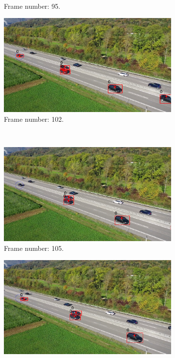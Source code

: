 \begin{figure}[H]
\begin{subfigure}{0.48\textwidth}
        \caption{Frame number: 95.}
        \label{fig:E1-V2-S0:03}
    \end{subfigure}
    \begin{subfigure}{0.48\textwidth}
        \centering
        \includegraphics[width=\linewidth]{../../../experiments/E1/V2/noPd/102}
        \caption{Frame number: 102.}
        \label{fig:E1-V2-S0:04}
    \end{subfigure}
    \\
    \begin{subfigure}{0.48\textwidth}
        \centering
        \includegraphics[width=\linewidth]{../../../experiments/E1/V2/noPd/105}
        \caption{Frame number: 105.}
        \label{fig:E1-V2-S0:05}
    \end{subfigure}
    \begin{subfigure}{0.48\textwidth}
        \centering
        \includegraphics[width=\linewidth]{../../../experiments/E1/V2/noPd/110}

\end{subfigure}
\end{figure}

